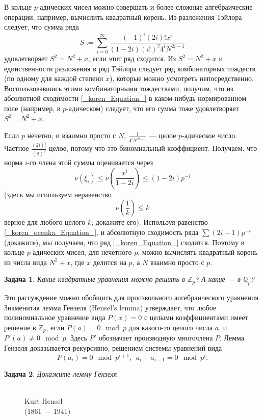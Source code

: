 \documentclass[12pt]{book}
\def\Z{{\mathbb Z}}
\def\Q{{\mathbb Q}}
\theoremstyle{upshape}
\newtheorem{zadacha}{Задача}[chapter]
\theoremstyle{generic}
\newtheorem{remark}[teorema]{Замечание}
\def\замечание{\begin{remark}}
\def\еза{\end{remark}}
\theoremstyle{upshapenonumber}
\newcommand{\следствие}{%
     \refstepcounter{teorema}
     {\noindent\bf Следствие \thechapter.\arabic{teorema}:\ }}
\newcommand{\пример}{%
     \refstepcounter{teorema}
     {\noindent\bf Пример \thechapter.\arabic{teorema}:\ }}
\newcommand{\лемма}{%
     \refstepcounter{teorema}
     {\noindent\bf Лемма \thechapter.\arabic{teorema}:\ }}
\newcommand{\теорема}{%
     \refstepcounter{teorema}
     {\noindent\bf Теорема \thechapter.\arabic{teorema}:\ }}
\newcommand{\утверждение}{%
     \refstepcounter{teorema}
     {\noindent\bf Утверждение \thechapter.\arabic{teorema}:\ }}
\def\ем{\em}
\def\задача{\begin{zadacha}}
\def\ез{\end{zadacha}}
\def\еу{\end{ukazanie}}
\def\ео{\end{opredelenie}}
\def\енум{\begin{enumerate}}
\def\ее{\end{enumerate}}
\begin{document}
В кольце $p$-адических чисел можно совершать
и более сложные алгебраические операции, например,
вычислить квадратный корень. Из разложения Тэйлора следует, 
что сумма ряда
\begin{equation}\label{_koren_Equation_}
S := \sum_{i=0}^\infty \frac{(-1)^i (2i)! x^i}{(1-2i)(i!)^2 4^i N^{2i-1}}
\end{equation}
удовлетворяет $S^2 = N^2 +x$, если этот ряд сходится.
Из $S^2 = N^2 +x$ и единственности разложения
в ряд Тэйлора следует ряд комбинаторных
тождеств (по одному для каждой степени $x$), 
которые можно усмотреть непосредственно.
Воспользовавшись этими комбинаторными тождествами,
получим, что из абсолютной сходимости 
\eqref{_koren_Equation_} в каком-нибудь нормированном
поле (например, в $p$-адическом) следует, что
его сумма тоже удовлетворяет $S^2 = N^2 +x$.

Если $p$ нечетно, и взаимно просто с $N$,
$\frac{1} {4^iN^{2i-1}}$ --- целое $p$-адическое число.
Частное $\frac{(2i)!}{(i!)^2}$ целое, потому что это
биномиальный коэффициент. Получаем, что норма $i$-го члена
этой суммы оценивается через
\begin{equation}\label{_koren_ocenka_Equation_}
\nu(\xi_i) \leq \nu\left(\frac {x^i}{1-2i}\right)\leq (1-2i) p^{-i}
\end{equation}
(здесь мы используем неравенство
\[
\nu \left(\frac 1 k\right) \leq k
\]
верное для любого целого $k$; докажите его).
Используя равенство \eqref{_koren_ocenka_Equation_},
и абсолютную сходимость ряда $\sum (2i-1) p^{-i}$
(докажите), мы получаем, что ряд \eqref{_koren_Equation_}
сходится. Поэтому в кольце $p$-адических чисел, для
нечетного $p$, можно вычислять квадратный корень из числа вида
$N^2 +x$, где $x$ делится на $p$, а $N$ взаимно
просто с $p$.

\задача
Какие квадратные уравнения можно решить в $\Z_p$?
А какие --- в $\Q_p$? 
\ез

Это рассуждение можно обобщить для произвольного
алгебраического уравнения. Знаменитая лемма Гензеля
(Hensel's lemma) утверждает, что любое полиномиальное
уравнение вида $P(x)=0$ с целыми коэффициентами
имеет решение в $\Z_p$, если $P(a) = 0 \mod p$
для какого-то целого числа $a$, и $P'(a) \neq 0 \mod p$.
Здесь $P'$ обозначает производную многочлена $P$.
Лемма Гензеля доказывается рекурсивно, решением
системы уравнений вида
\[
P(a_i) = 0 \mod p^{i+1}, \ \  a_i-a_{i-1} = 0 \mod p^i.
\]

\задача
Докажите лемму Гензеля.
\ез


\begin{figure}[ht]
\begin{center}
\\
Kurt Hensel\\
(1861 --- 1941) 
\end{center}
\end{figure}
\end{document}
